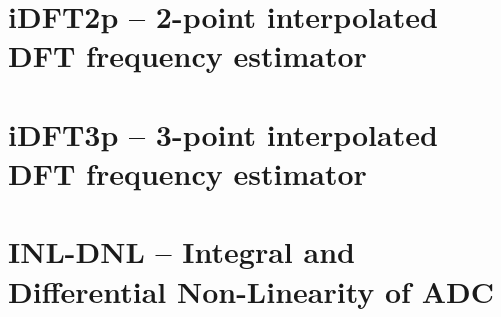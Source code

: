 \documentclass[12pt,a4paper,oneside]{report} %
\begin{document}
\section*{\examplesection} %


\chapter{iDFT2p -- 2-point interpolated DFT frequency estimator} %
\section*{\infosection} %

\section*{\examplesection} %


\chapter{iDFT3p -- 3-point interpolated DFT frequency estimator} %
\section*{\infosection} %

\section*{\examplesection} %


\chapter{INL-DNL -- Integral and Differential Non-Linearity of ADC} %
\end{document}
